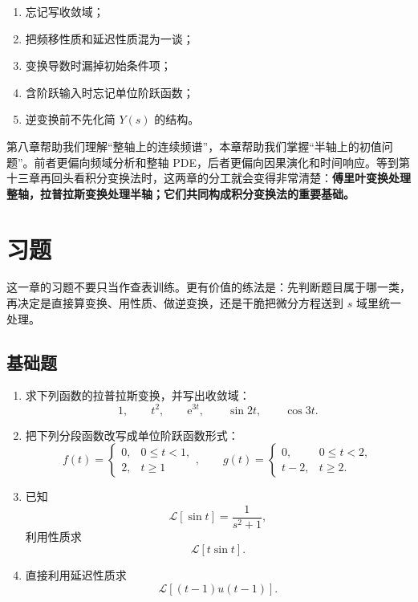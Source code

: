\begin{jinshi}[本章最容易混淆的地方]
\begin{enumerate}
    \item 忘记写收敛域；
    \item 把频移性质和延迟性质混为一谈；
    \item 变换导数时漏掉初始条件项；
    \item 含阶跃输入时忘记单位阶跃函数；
    \item 逆变换前不先化简 $Y(s)$ 的结构。
\end{enumerate}
\end{jinshi}

\begin{tishi}[和前后内容的联系]
第八章帮助我们理解``整轴上的连续频谱''，本章帮助我们掌握``半轴上的初值问题''。前者更偏向频域分析和整轴 PDE，后者更偏向因果演化和时间响应。等到第十三章再回头看积分变换法时，这两章的分工就会变得非常清楚：\textbf{傅里叶变换处理整轴，拉普拉斯变换处理半轴；它们共同构成积分变换法的重要基础。}
\end{tishi}

\section{习题}

\begin{tishi}[做题前的小建议]
这一章的习题不要只当作查表训练。更有价值的练法是：先判断题目属于哪一类，再决定是直接算变换、用性质、做逆变换，还是干脆把微分方程送到 $s$ 域里统一处理。
\end{tishi}

\subsection*{基础题}

\begin{enumerate}[label=\arabic*.]
    \item 求下列函数的拉普拉斯变换，并写出收敛域：
    \[
        1,\qquad t^2,\qquad \mathrm{e}^{3t},\qquad \sin 2t,\qquad \cos 3t.
    \]

    \item 把下列分段函数改写成单位阶跃函数形式：
    \[
        f(t)=
        \begin{cases}
            0, & 0\le t<1,\\
            2, & t\ge 1
        \end{cases}
        ,
        \qquad
        g(t)=
        \begin{cases}
            0, & 0\le t<2,\\
            t-2, & t\ge 2.
        \end{cases}
    \]

    \item 已知
    \[
        \mathcal{L}[\sin t]=\frac{1}{s^2+1},
    \]
    利用性质求
    \[
        \mathcal{L}[t\sin t].
    \]

    \item 直接利用延迟性质求
    \[
        \mathcal{L}[(t-1)u(t-1)].
    \]
\end{enumerate}

